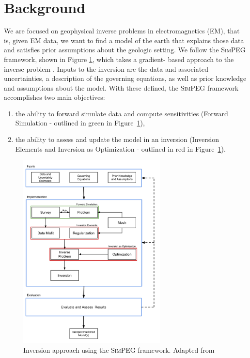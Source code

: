 \documentclass[preprint,review,3p,times,onecolumn,authoryear]{elsarticle}
\newcommand{\SimPEG}{\textsc{SimPEG}\xspace}
\begin{document}
\section{Background}
\label{sec:Background}

We are focused on geophysical inverse problems in electromagnetics (EM), that
is, given EM data, we want to find a model of the earth that explains those
data and satisfies prior assumptions about the geologic setting. We follow the
\SimPEG framework, shown in Figure \ref{fig:SimPEG}, which takes a gradient-
based approach to the inverse problem \citep{Cockett2015}. Inputs to the
inversion are the data and associated uncertainties, a description of the
governing equations, as well as prior knowledge and assumptions about the
model. With these defined, the \SimPEG framework accomplishes two main
objectives:
\begin{enumerate}
\item the ability to forward simulate data and compute sensitivities (Forward Simulation - outlined in green in Figure~\ref{fig:SimPEG}),
\item the ability to assess and update the model in an inversion (Inversion Elements and Inversion as Optimization - outlined in red in Figure~\ref{fig:SimPEG}).
\end{enumerate}


{%
\begin{figure}[htb!]
    \centering
    \includegraphics[width=7.5cm]{images/SimPEGInversion}
\caption{Inversion approach using the \SimPEG framework. Adapted from \cite{Cockett2015}}
\label{fig:SimPEG}
\end{figure}
}
\end{document}
